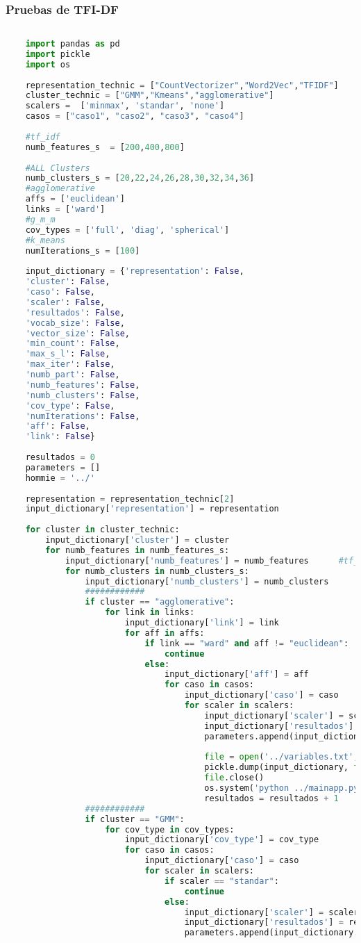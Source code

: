 \documentclass[12pt]{article}
\begin{document}
	\subsubsection*{Pruebas de TFI-DF}
	\begin{lstlisting}[language=Python, 
	caption = Rutina de pruebas TFI-DF,
	label={lst:pruebasTfIdf}]
	
	import pandas as pd
	import pickle
	import os
	
	representation_technic = ["CountVectorizer","Word2Vec","TFIDF"]
	cluster_technic = ["GMM","Kmeans","agglomerative"]
	scalers =  ['minmax', 'standar', 'none']
	casos = ["caso1", "caso2", "caso3", "caso4"]
	
	#tf_idf
	numb_features_s  = [200,400,800]
	
	#ALL Clusters
	numb_clusters_s = [20,22,24,26,28,30,32,34,36]
	#agglomerative
	affs = ['euclidean']
	links = ['ward']
	#g_m_m
	cov_types = ['full', 'diag', 'spherical']
	#k_means
	numIterations_s = [100]
	
	input_dictionary = {'representation': False,
	'cluster': False,
	'caso': False,
	'scaler': False,
	'resultados': False,
	'vocab_size': False,
	'vector_size': False,
	'min_count': False,
	'max_s_l': False,
	'max_iter': False,
	'numb_part': False,
	'numb_features': False,
	'numb_clusters': False,
	'cov_type': False,
	'numIterations': False,
	'aff': False,
	'link': False}
	
	resultados = 0
	parameters = []
	hommie = '../'
	
	representation = representation_technic[2]
	input_dictionary['representation'] = representation
	
	for cluster in cluster_technic:
		input_dictionary['cluster'] = cluster
		for numb_features in numb_features_s:
			input_dictionary['numb_features'] = numb_features      #tf_idf
			for numb_clusters in numb_clusters_s:
				input_dictionary['numb_clusters'] = numb_clusters
				############
				if cluster == "agglomerative":
					for link in links:
						input_dictionary['link'] = link
						for aff in affs:
							if link == "ward" and aff != "euclidean":
								continue
							else:
								input_dictionary['aff'] = aff                
								for caso in casos:
									input_dictionary['caso'] = caso
									for scaler in scalers:
										input_dictionary['scaler'] = scaler
										input_dictionary['resultados'] = resultados    
										parameters.append(input_dictionary.copy())                            
										
										file = open('../variables.txt', 'wb')
										pickle.dump(input_dictionary, file)
										file.close()
										os.system('python ../mainapp.py')
										resultados = resultados + 1 
				############
				if cluster == "GMM":
					for cov_type in cov_types:
						input_dictionary['cov_type'] = cov_type             
						for caso in casos:
							input_dictionary['caso'] = caso
							for scaler in scalers:
								if scaler == "standar":
									continue
								else:
									input_dictionary['scaler'] = scaler
									input_dictionary['resultados'] = resultados  
									parameters.append(input_dictionary.copy())     
									

\end{lstlisting}
\end{document}
